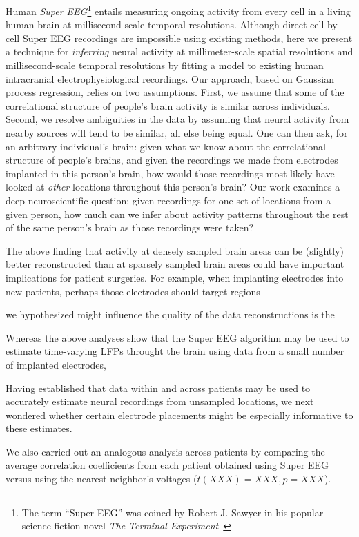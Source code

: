 Human \textit{Super EEG}\footnote{The term ``Super EEG'' was
coined by Robert J. Sawyer in his popular science fiction novel
\textit{The Terminal Experiment}~\cite{Sawy95}} entails
measuring ongoing activity from every cell in a living human brain
at millisecond-scale temporal resolutions.  Although direct
cell-by-cell Super EEG recordings are impossible using existing
methods, here we present a technique for \textit{inferring} neural
activity at millimeter-scale spatial resolutions and millisecond-scale temporal resolutions by fitting a model to existing human intracranial electrophysiological recordings.  Our approach, based
on Gaussian process regression, relies on two assumptions.  First,
we assume that some of the correlational structure of people's
brain activity is similar across individuals.  Second, we resolve
ambiguities in the data by assuming that neural activity from
nearby sources will tend to be similar, all else being equal.  One
can then ask, for an arbitrary individual's brain: given what we
know about the correlational structure of \textother people's brains,
and given the recordings we made from electrodes implanted in this
person's brain, how would those recordings most likely have looked
at \textit{other} locations throughout this person's brain?  Our work examines a deep neuroscientific question: given recordings for one set of locations from a given person, how much can we infer about activity patterns throughout the rest of the same person's brain as those recordings were taken?

The above finding that activity at densely sampled brain areas can be
(slightly) better reconstructed than at sparsely sampled brain areas
could have important implications for patient surgeries.  For example,
when implanting electrodes into new patients, perhaps those electrodes
should target regions

we hypothesized might influence the quality of the
data reconstructions is the 

Whereas the above analyses show that the Super EEG algorithm may be
used to estimate time-varying LFPs throught the brain using data from a small
number of implanted electrodes, 

Having established that data within and across patients may be used to
accurately estimate neural recordings from unsampled locations, we
next wondered whether certain electrode placements might be especially
informative to these estimates.

We also carried out an analogous analysis
across patients by comparing the average correlation coefficients from
each patient obtained using Super EEG versus using the nearest
neighbor's voltages ($t(XXX) = XXX, p = XXX$).  

